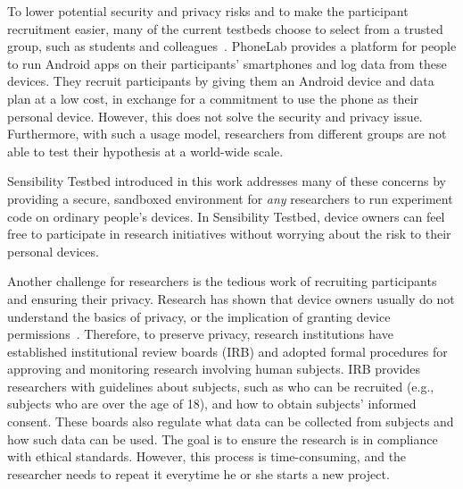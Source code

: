 To lower potential security and privacy risks and to make the 
participant recruitment easier, many of the current testbeds choose to 
select from a trusted group, such as students and 
colleagues~\cite{hao2013isleep, wang2012no, 
wang2013sensing}. PhoneLab provides a platform for 
people to run Android apps on their participants' smartphones 
and log data from these devices. They recruit participants by 
giving them an Android device and data plan at a low cost, in 
exchange for a commitment to use the phone as their personal 
device. However, this does not solve the security and privacy issue. 
Furthermore, with such a usage model, researchers from different  
groups are not able to test their hypothesis at a world-wide scale.

Sensibility Testbed introduced in this work addresses many of 
these concerns by providing a secure, sandboxed environment 
for \textit{any} researchers to run experiment code on ordinary people's 
devices. In Sensibility Testbed, device owners can feel free to 
participate in research initiatives without worrying about the risk 
to their personal devices.

Another challenge for researchers is the tedious work
of recruiting participants and ensuring their privacy. 
Research has shown that device owners usually do not understand the 
basics of privacy, or the implication of granting device 
permissions~\cite{camp2015respecting}. 
Therefore, to preserve privacy, research institutions have established 
institutional review boards (IRB) \cite{irb} and adopted formal 
procedures for approving and monitoring research involving 
human subjects. IRB provides researchers with guidelines about 
subjects, such as who can be recruited (e.g., subjects
who are over the age of 18), and 
how to obtain subjects' informed consent. These boards also 
regulate what data can be collected from subjects and how 
such data can be used. The goal is
to ensure the research is in compliance with ethical standards. 
However, this process is time-consuming, and the researcher needs 
to repeat it everytime he or she starts a new project. 

